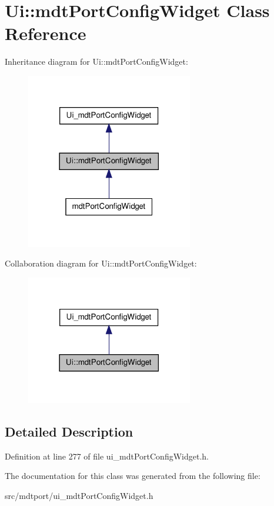 \hypertarget{class_ui_1_1mdt_port_config_widget}{
\section{Ui::mdtPortConfigWidget Class Reference}
\label{class_ui_1_1mdt_port_config_widget}
}


Inheritance diagram for Ui::mdtPortConfigWidget:\nopagebreak
\begin{figure}[H]
\begin{center}
\leavevmode
\includegraphics[width=206pt]{class_ui_1_1mdt_port_config_widget__inherit__graph}
\end{center}
\end{figure}


Collaboration diagram for Ui::mdtPortConfigWidget:\nopagebreak
\begin{figure}[H]
\begin{center}
\leavevmode
\includegraphics[width=206pt]{class_ui_1_1mdt_port_config_widget__coll__graph}
\end{center}
\end{figure}


\subsection{Detailed Description}


Definition at line 277 of file ui\_\-mdtPortConfigWidget.h.



The documentation for this class was generated from the following file:\begin{DoxyCompactItemize}
\item 
src/mdtport/ui\_\-mdtPortConfigWidget.h\end{DoxyCompactItemize}

